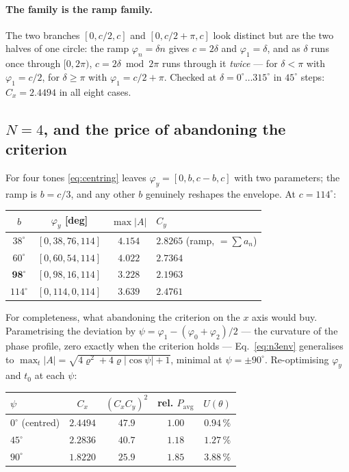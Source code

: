 \documentclass[11pt,a4paper]{article}
\newcommand{\crest}{\ensuremath{C}}
\begin{document}
\paragraph{The family is the ramp family.} The two branches
$[0,c/2,c]$ and $[0,c/2+\pi,c]$ look distinct but are the two halves of one
circle: the ramp $\varphi_n=\delta n$ gives $c=2\delta$ and
$\varphi_1=\delta$, and as $\delta$ runs once through $[0,2\pi)$,
$c=2\delta\bmod2\pi$ runs through it \emph{twice} --- for $\delta<\pi$ with
$\varphi_1=c/2$, for $\delta\ge\pi$ with $\varphi_1=c/2+\pi$. Checked at
$\delta=0^\circ\dots315^\circ$ in $45^\circ$ steps: $\crest_x=2.4494$ in all
eight cases.

\subsection{\boldmath$N=4$, and the price of abandoning the criterion}
For four tones \eqref{eq:centring} leaves $\varphi_y=[0,b,c-b,c]$ with two
parameters; the ramp is $b=c/3$, and any other $b$ genuinely reshapes the
envelope. At $c=114^\circ$:

\begin{center}\small
\begin{tabular}{cccl}
\toprule
$b$ & $\varphi_y$ [deg] & $\max|A|$ & $\crest_y$\\
\midrule
$38^\circ$ & $[0,38,76,114]$ & $4.154$ & $2.8265$ (ramp, $=\sum a_n$)\\
$60^\circ$ & $[0,60,54,114]$ & $4.022$ & $2.7364$\\
$\mathbf{98^\circ}$ & $[0,98,16,114]$ & $\mathbf{3.228}$ & $\mathbf{2.1963}$\\
$114^\circ$ & $[0,114,0,114]$ & $3.639$ & $2.4761$\\
\bottomrule
\end{tabular}
\end{center}

\noindent For completeness, what abandoning the criterion on the $x$ axis would
buy. Parametrising the deviation by $\psi=\varphi_1-(\varphi_0+\varphi_2)/2$
--- the curvature of the phase profile, zero exactly when the criterion holds
--- Eq.~\eqref{eq:n3env} generalises to
$\max_t|A|=\sqrt{4\varrho^2+4\varrho|\cos\psi|+1}$, minimal at
$\psi=\pm90^\circ$. Re-optimising $\varphi_y$ and $t_0$ at each $\psi$:

\begin{center}\small
\begin{tabular}{lcccc}
\toprule
$\psi$ & $\crest_x$ & $(\crest_x\crest_y)^2$ & rel. $P_\mathrm{avg}$ & $U(\theta)$\\
\midrule
$0^\circ$ (centred) & $2.4494$ & $47.9$ & $1.00$ & $\mathbf{0.94\,\%}$\\
$45^\circ$ & $2.2836$ & $40.7$ & $1.18$ & $1.27\,\%$\\
$90^\circ$ & $\mathbf{1.8220}$ & $25.9$ & $\mathbf{1.85}$ & $3.88\,\%$\\
\bottomrule
\end{tabular}
\end{center}
\end{document}
